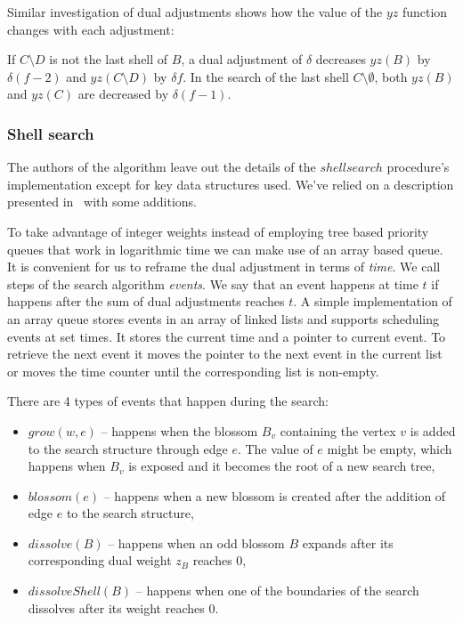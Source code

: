 Similar investigation of dual adjustments shows how the value of the $yz$ function changes with each adjustment:

\begin{lemma}\label{lem:search_duals}
    If $C \setminus D$ is not the last shell of $B$, a dual adjustment of $\delta$ decreases $yz(B)$ by $\delta(f-2)$ and $yz(C \setminus D)$ by $\delta f$. In the search of the last shell $C \setminus \emptyset$, both $yz(B)$ and $yz(C)$ are decreased by $\delta(f-1)$.
\end{lemma}

\subsubsection{Shell search}

The authors of the algorithm leave out the details of the $shellsearch$ procedure's implementation except for key data structures used. We've relied on a description presented in~\cite{duan2018scaling} with some additions.

To take advantage of integer weights instead of employing tree based priority queues that work in logarithmic time we can make use of an array based queue. It is convenient for us to reframe the dual adjustment in terms of \textit{time}. We call steps of the search algorithm \textit{events}. We say that an event happens at time $t$ if happens after the sum of dual adjustments reaches $t$. A simple implementation of an array queue stores events in an array of linked lists and supports scheduling events at set times. It stores the current time and a pointer to current event. To retrieve the next event it moves the pointer to the next event in the current list or moves the time counter until the corresponding list is non-empty.

There are 4 types of events that happen during the search:

\begin{itemize}
    \item $grow(w, e)$ – happens when the blossom $B_v$ containing the vertex $v$ is added to the search structure through edge $e$. The value of $e$ might be empty, which happens when $B_v$ is exposed and it becomes the root of a new search tree,
    \item $blossom(e)$ – happens when a new blossom is created after the addition of edge $e$ to the search structure,
    \item $dissolve(B)$ – happens when an odd blossom $B$ expands after its corresponding dual weight $z_B$ reaches $0$,
    \item $dissolveShell(B)$ – happens when one of the boundaries of the search dissolves after its weight reaches $0$. 
\end{itemize}

